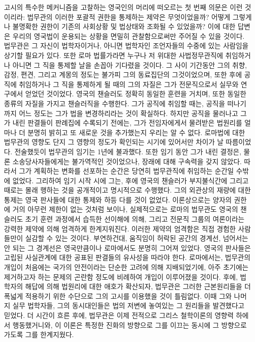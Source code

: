 고시의 특수한 메커니즘을 고찰하는 영국인의 머리에 떠오르는
첫 번째 의문은 이런 것이리라: 법무관의 이러한 포괄적 권한을 통제하는
제약은 무엇이었을까? 어떻게 그렇게나 불명확한 권한이
기존의 사회상황 및 법상태와 조화될 수 있었을까?
이에 대한 답변은 우리의 영국법이 운용되는 상황을 면밀히 관찰함으로써만
주어질 수 있을 것이다.
법무관은 그 자신이 법학자이거나, 아니면 법학자인 조언자들의 수중에 있는
사람임을 상기할 필요가 있다.
또한 로마 법률가라면 누구나 저 위대한 사법정무관직에 취임하거나 아니면
그 직을 통제할 날을 손꼽아 기다렸을 것이다.
그 사이 기간동안 그의 취향, 감정, 편견, 그리고 계몽의 정도는
불가피 그의 동료집단의 그것이었으며,
또한 후에 공직에 취임하거나 그 직을 통제하게 될 때의 그의 자질은
그가 전문직으로서 실무와 연구에서 얻었던 것이었다.
영국의 챈슬러도 정확히 동일한 훈련을 거치며, 또한 동일한 종류의 자질을 가지고
챈슬러직을 수행한다.
그가 공직에 취임할 때는, 공직을 떠나기까지 어느 정도는
그가 법을 변경하리라는 것이 확실하다.
하지만 공직을 물러나고 그가 내린 판결들이 판례집에 수록되기
전에는, 그가 전임자에게서 물려받은 법원리를 얼마나 더 분명히 밝히고
또 새로운 것을 추가했는지 우리는 알 수 없다.
로마법에 대한 법무관의 영향도 단지 그 영향의 정도가 확인되는 시기에 있어서만
차이가 날 따름이었다.
전술했듯이 법무관의 임기는 1년에 불과했다.
또한 임기 동안 그가 내린 결정은, 물론 소송당사자들에게는 불가역적인 것이었으나,
장래에 대해 구속력을 갖지 않았다.
따라서 그가 계획하는 변화를 선포하는 순간은 당연히
법무관직에 취임하는 순간일 수밖에 없었다.
그리하여 임기 시작 시에 그는,
후에 영국의 챈슬러가 부지불식간에 그리고 때로는 몰래 행하는 것을
공개적이고 명시적으로 수행했다.
그의 외관상의 재량에 대한 통제는 영국 판사들에 대한 통제와
하등 다를 것이 없었다.
이론상으로는 양자의 권한에 거의 아무런 제한이 없는 것처럼 보이나,
실제적으로는 로마의 법무관도 영국의 챈슬러도
초기 훈련 과정에서 습득한 선이해에 의해, 그리고
전문직 그룹의 여론이라는 강력한 제약에 의해
엄격하게 한계지워진다.
이러한 제약의 엄격함은 직접 경험한 사람들만이 실감할 수 있는 것이다.
부연하건대, 움직임이 허락된 공간의 경계선, 넘어서는 안 되는 그 경계선은
영국만큼이나 로마에서도 분명히 그어져 있었다.
영국의 판사들은 고립된 사실관계에 대한 공표된 판결들의 유사성을 따라야 한다.
로마에서는, 법무관의 개입이 처음에는 국가의 안전이라는 단순한 고려에 의해
지배되었기에, 아주 초기에는 제거하고자 하는 문제의 곤란함 정도에 비례하여
개입이 이루어졌을 것이다.
후에, 법학자의 해답에 의해 법원리에 대한 애호가 확산되자,
법무관은 그러한 근본원리들을 더 폭넓게
적용하기 위한 수단으로 그의 고시를 이용했을 것이 틀림없다.
이때 그와 나머지 실무 법학자들, 그의 동시대인들은
법의 저변에 놓여있는 그 원리들을 발견했다고 믿었다.
더 시간이 흐른 후에,
법무관은 이제 전적으로 그리스 철학이론의 영향력 하에서
행동했거니와, 이 이론은 특정한 진화의 방향으로 그를 이끄는 동시에
그 방향으로 가도록 그를 한계지웠다.

